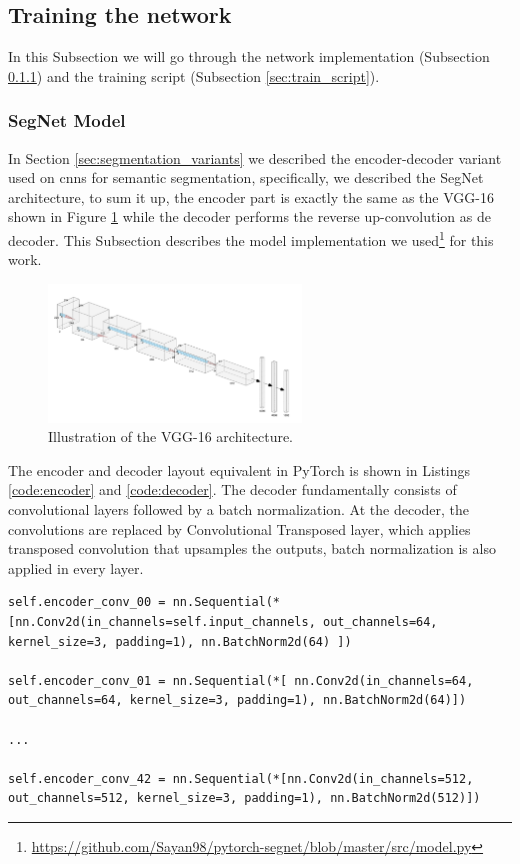 \subsection{Training the network}
\label{sec:training}
In this Subsection we will go through the network implementation (Subsection \ref{sec:model}) and the training script (Subsection \ref{sec:train_script}).

\subsubsection{SegNet Model}
\label{sec:model}
In Section \ref{sec:segmentation_variants} we described the encoder-decoder variant used on \gls{cnn}s for semantic segmentation, specifically, we described the SegNet architecture, to sum it up, the encoder part is exactly the same as the VGG-16 shown in Figure \ref{fig:vgg16} while the decoder performs the reverse up-convolution as de decoder. This Subsection describes the model implementation we used\footnote{\url{https://github.com/Sayan98/pytorch-segnet/blob/master/src/model.py}} for this work.

\begin{figure}[h]
	\includegraphics[width=0.6\textwidth]{archivos/vgg16.png}
	\centering
	\caption{Illustration of the VGG-16 architecture.}
	\label{fig:vgg16}
\end{figure}

The encoder and decoder layout equivalent in PyTorch is shown in Listings \ref{code:encoder} and \ref{code:decoder}. The decoder fundamentally consists of convolutional layers followed by a batch normalization. At the decoder, the convolutions are replaced by Convolutional Transposed layer, which applies transposed convolution that upsamples the outputs, batch normalization is also applied in every layer.

\begin{lstlisting}[style=Python-color, caption=First layers of the SegNet encoder, frame=single, label=code:encoder]
self.encoder_conv_00 = nn.Sequential(*[nn.Conv2d(in_channels=self.input_channels, out_channels=64, kernel_size=3, padding=1), nn.BatchNorm2d(64) ])

self.encoder_conv_01 = nn.Sequential(*[ nn.Conv2d(in_channels=64, out_channels=64, kernel_size=3, padding=1), nn.BatchNorm2d(64)])

...

self.encoder_conv_42 = nn.Sequential(*[nn.Conv2d(in_channels=512, out_channels=512, kernel_size=3, padding=1), nn.BatchNorm2d(512)])
\end{lstlisting}

